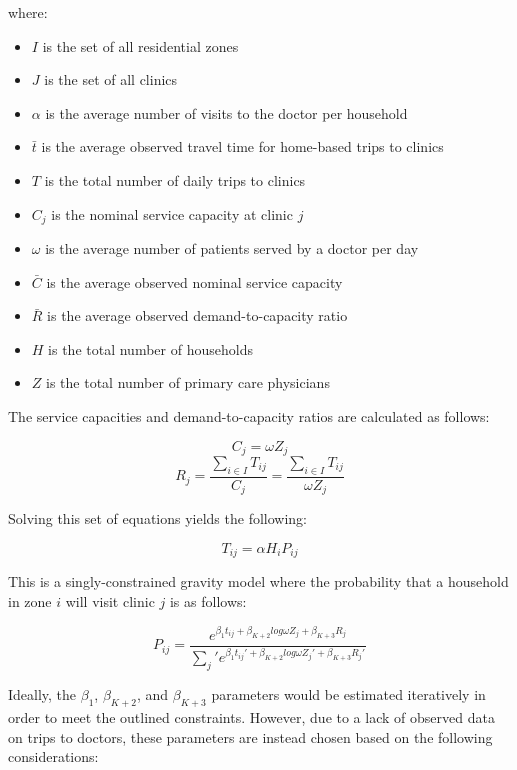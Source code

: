 \documentclass{article}
\begin{document}
where:

\begin{itemize}
\tightlist
\item
  \(I\) is the set of all residential zones
\item
  \(J\) is the set of all clinics
\item
  \(\alpha\) is the average number of visits to the doctor per household
\item
  \(\bar{t}\) is the average observed travel time for home-based trips
  to clinics
\item
  \(T\) is the total number of daily trips to clinics
\item
  \(C_j\) is the nominal service capacity at clinic \(j\)
\item
  \(\omega\) is the average number of patients served by a doctor per
  day
\item
  \(\bar{C}\) is the average observed nominal service capacity
\item
  \(\bar{R}\) is the average observed demand-to-capacity ratio
\item
  \(H\) is the total number of households
\item
  \(Z\) is the total number of primary care physicians
\end{itemize}

The service capacities and demand-to-capacity ratios are calculated as
follows:

\[
C_j = \omega Z_j
\] \[
R_j = \frac{\sum_{i \in I} T_{ij}}{C_j} = \frac{\sum_{i \in I} T_{ij}}{\omega Z_j}
\]

Solving this set of equations yields the following:

\[
T_{ij} = \alpha H_i P_{ij}
\]

This is a singly-constrained gravity model where the probability that a
household in zone \(i\) will visit clinic \(j\) is as follows:

\[
P_{ij} = \frac{e^{\beta_1 t_{ij} + \beta_{K+2} log \omega Z_j + \beta_{K + 3} R_j}}{\sum_j\prime e^{\beta_1 t_{ij}\prime + \beta_{K+2} log \omega Z_j\prime + \beta_{K + 3} R_j\prime}}
\]

Ideally, the \(\beta_1\), \(\beta_{K+2}\), and \(\beta_{K + 3}\)
parameters would be estimated iteratively in order to meet the outlined
constraints. However, due to a lack of observed data on trips to
doctors, these parameters are instead chosen based on the following
considerations:
\end{document}
